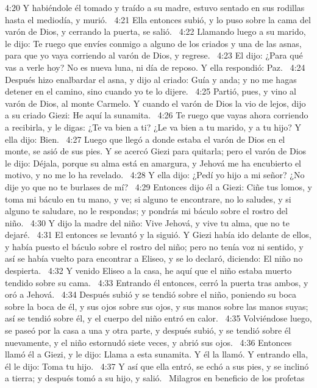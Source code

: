 4:20 Y habiéndole él tomado y traído a su madre, estuvo sentado en sus rodillas hasta el mediodía, y murió.  
4:21 Ella entonces subió, y lo puso sobre la cama del varón de Dios, y cerrando la puerta, se salió.  
4:22 Llamando luego a su marido, le dijo: Te ruego que envíes conmigo a alguno de los criados y una de las asnas, para que yo vaya corriendo al varón de Dios, y regrese.  
4:23 El dijo: ¿Para qué vas a verle hoy? No es nueva luna, ni día de reposo. Y ella respondió: Paz.  
4:24 Después hizo enalbardar el asna, y dijo al criado: Guía y anda; y no me hagas detener en el camino, sino cuando yo te lo dijere.  
4:25 Partió, pues, y vino al varón de Dios, al monte Carmelo. Y cuando el varón de Dios la vio de lejos, dijo a su criado Giezi: He aquí la sunamita.  
4:26 Te ruego que vayas ahora corriendo a recibirla, y le digas: ¿Te va bien a ti? ¿Le va bien a tu marido, y a tu hijo? Y ella dijo: Bien.  
4:27 Luego que llegó a donde estaba el varón de Dios en el monte, se asió de sus pies. Y se acercó Giezi para quitarla; pero el varón de Dios le dijo: Déjala, porque su alma está en amargura, y Jehová me ha encubierto el motivo, y no me lo ha revelado.  
4:28 Y ella dijo: ¿Pedí yo hijo a mi señor? ¿No dije yo que no te burlases de mí?  
4:29 Entonces dijo él a Giezi: Ciñe tus lomos, y toma mi báculo en tu mano, y ve; si alguno te encontrare, no lo saludes, y si alguno te saludare, no le respondas; y pondrás mi báculo sobre el rostro del niño.  
4:30 Y dijo la madre del niño: Vive Jehová, y vive tu alma, que no te dejaré.  
4:31 El entonces se levantó y la siguió. Y Giezi había ido delante de ellos, y había puesto el báculo sobre el rostro del niño; pero no tenía voz ni sentido, y así se había vuelto para encontrar a Eliseo, y se lo declaró, diciendo: El niño no despierta.  
4:32 Y venido Eliseo a la casa, he aquí que el niño estaba muerto tendido sobre su cama.  
4:33 Entrando él entonces, cerró la puerta tras ambos, y oró a Jehová.  
4:34 Después subió y se tendió sobre el niño, poniendo su boca sobre la boca de él, y sus ojos sobre sus ojos, y sus manos sobre las manos suyas; así se tendió sobre él, y el cuerpo del niño entró en calor.  
4:35 Volviéndose luego, se paseó por la casa a una y otra parte, y después subió, y se tendió sobre él nuevamente, y el niño estornudó siete veces, y abrió sus ojos.  
4:36 Entonces llamó él a Giezi, y le dijo: Llama a esta sunamita. Y él la llamó. Y entrando ella, él le dijo: Toma tu hijo.  
4:37 Y así que ella entró, se echó a sus pies, y se inclinó a tierra; y después tomó a su hijo, y salió.  
Milagros en beneficio de los profetas  
